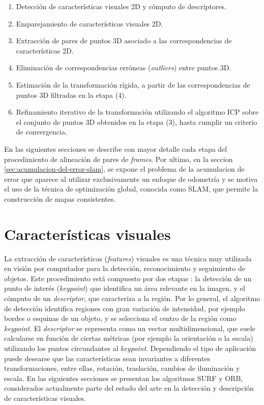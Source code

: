 \begin{enumerate}
\item Detección de características visuales 2D y cómputo de descriptores.

\item Emparejamiento de características visuales 2D.

\item Extracción de pares de puntos 3D asociado a las correspondencias de características 2D.

\item Eliminación de correspondencias erróneas (\textit{outliers}) entre puntos 3D.

\item Estimación de la transformación rígida, a partir de las correspondencias de puntos 3D filtradas en la etapa (4).

\item Refinamiento iterativo de la transformación utilizando el algoritmo ICP sobre el conjunto de puntos 3D obtenidos en la etapa (3), hasta cumplir un criterio de convergencia.
\end{enumerate}

En las siguientes secciones se describe con mayor detalle cada etapa del procedimiento de alineación de pares de \textit{frames}. Por ultimo, en la seccion \ref{sec:acumulacion-del-error-slam}, se expone el problema de la acumulacion de error que aparece al utilizar exclusivamente un enfoque de odometría y se motiva el uso de la técnica de optimización global, conocida como SLAM, que permite la construcción de mapas consistentes.

\section{Características visuales}
\label{sec:features}

La extracción de características (\textit{features}) visuales es una técnica muy utilizada en visión por computador para la detección, reconocimiento y seguimiento de objetos. Este procedimiento está compuesto por dos etapas : la detección de un punto de interés (\textit{keypoint}) que identifica un área relevante en la imagen, y el cómputo de un \textit{descriptor}, que caracteriza a la región. Por lo general, el algoritmo de detección identifica regiones con gran variación de intensidad, por ejemplo bordes o esquinas de un objeto, y se selecciona el centro de la región como \textit{keypoint}. El \textit{descriptor} se representa como un vector multidimensional, que suele calcularse en función de ciertas métricas (por ejemplo la orientación o la escala) utilizando los puntos circundantes al \textit{keypoint}. Dependiendo el tipo de aplicación puede desearse que las características sean invariantes a diferentes transformaciones, entre ellas, rotación, traslación, cambios de iluminación y escala. En las siguientes secciones se presentan los algoritmos SURF y ORB, considerados actualmente parte del estado del arte en la detección y descripción de características visuales.


